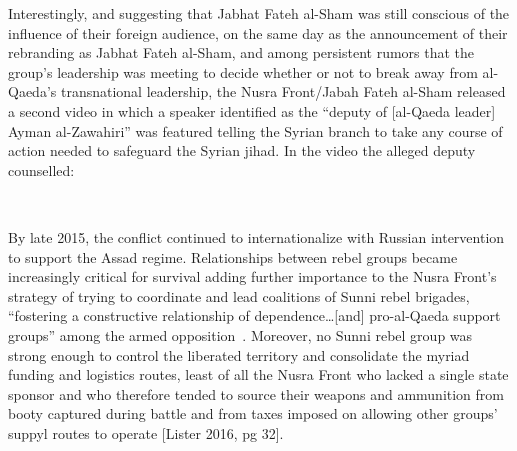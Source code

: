 Interestingly, and suggesting that Jabhat Fateh al-Sham was still conscious of the influence of their foreign audience, on the same day as the announcement of their rebranding as Jabhat Fateh al-Sham, and among persistent rumors that the group’s leadership was meeting to decide whether or not to break away from al-Qaeda’s transnational leadership, the Nusra Front/Jabah Fateh al-Sham released a second video in which a speaker identified as the “deputy of [al-Qaeda leader] Ayman al-Zawahiri” was featured telling the Syrian branch to take any course of action needed to safeguard the Syrian jihad. In the video the alleged deputy counselled:

~\autocite{jabhatfs2016deputy}

By late 2015, the conflict continued to internationalize with Russian intervention to support the Assad regime. Relationships between rebel groups became increasingly critical for survival adding further importance to the Nusra Front’s strategy of trying to coordinate and lead coalitions of Sunni rebel brigades, “fostering a constructive relationship of dependence…[and] pro-al-Qaeda support groups” among the armed opposition~\autocite[33]{lister2016}. Moreover, no Sunni rebel group was strong enough to control the liberated territory and consolidate the myriad funding and logistics routes, least of all the Nusra Front who lacked a single state sponsor and who therefore tended to source their weapons and ammunition from booty captured during battle and from taxes imposed on allowing other groups’ suppyl routes to operate [Lister 2016, pg 32].


